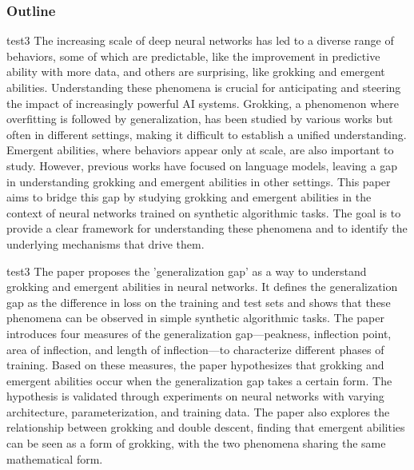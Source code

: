\subsubsection{Outline}
\begin{example}{}{test3}
\textcolor[RGB]{0,0,139}{The increasing scale of deep neural networks has led to a diverse range of behaviors, some of which are predictable, like the improvement in predictive ability with more data, and others are surprising, like grokking and emergent abilities. Understanding these phenomena is crucial for anticipating and steering the impact of increasingly powerful AI systems. Grokking, a phenomenon where overfitting is followed by generalization, has been studied by various works but often in different settings, making it difficult to establish a unified understanding. Emergent abilities, where behaviors appear only at scale, are also important to study. However, previous works have focused on language models, leaving a gap in understanding grokking and emergent abilities in other settings. This paper aims to bridge this gap by studying grokking and emergent abilities in the context of neural networks trained on synthetic algorithmic tasks. The goal is to provide a clear framework for understanding these phenomena and to identify the underlying mechanisms that drive them.}

\end{example}
\begin{note}{}{test3}
\textcolor[RGB]{0,0,139}{The paper proposes the 'generalization gap' as a way to understand grokking and emergent abilities in neural networks. It defines the generalization gap as the difference in loss on the training and test sets and shows that these phenomena can be observed in simple synthetic algorithmic tasks. The paper introduces four measures of the generalization gap—peakness, inflection point, area of inflection, and length of inflection—to characterize different phases of training. Based on these measures, the paper hypothesizes that grokking and emergent abilities occur when the generalization gap takes a certain form. The hypothesis is validated through experiments on neural networks with varying architecture, parameterization, and training data. The paper also explores the relationship between grokking and double descent, finding that emergent abilities can be seen as a form of grokking, with the two phenomena sharing the same mathematical form.}

\end{note}
